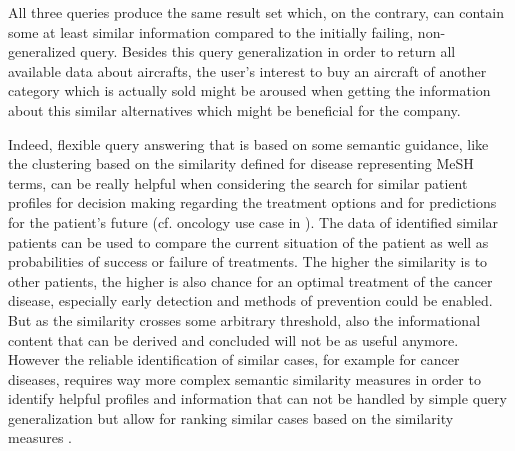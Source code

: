 \begin{exmp}
All three queries produce the same result set which, on the contrary, can contain some at least similar information compared to the initially failing,
non-generalized query. Besides this query generalization in order to return all available data about aircrafts, the user's interest to buy an aircraft of
another category which is actually sold might be aroused when getting the information about this similar alternatives which might be beneficial for the
company. 

Indeed, flexible query answering that is based on some semantic guidance, like the clustering based on the similarity defined for disease representing 
MeSH terms, can be really helpful when considering the search for similar patient profiles for decision making regarding the treatment options and for 
predictions for the patient's future (cf. oncology use case in \cite{Haarbrandt2018}). The data of identified similar patients can be used to compare the
current situation of the patient as well as probabilities of success or failure of treatments. The higher the similarity is to other patients, the higher 
is also chance for an optimal treatment of the cancer disease, especially early detection and methods of prevention could be enabled. But as the 
similarity crosses some arbitrary threshold, also the informational content that can be derived and concluded will not be as useful anymore.
However the reliable identification of similar cases, for example for cancer diseases, requires way more complex semantic similarity measures in order 
to identify helpful profiles and information that can not be handled by simple query generalization but allow for ranking similar cases based on the
similarity measures \citep{Haarbrandt2018}.

\end{exmp}